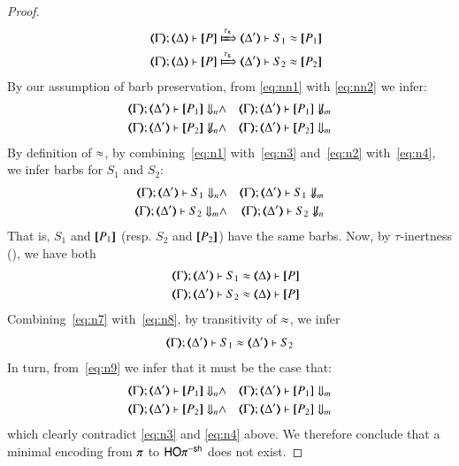 \documentclass[preprint,11pt]{elsarticle}
\begin{document}
{{\begin{proof}
\begin{eqnarray}
		& & \horel{\mapt{\Gamma}}{\mapt{\Delta}}{\map{P}}{\Hby{\stau}}{\mapt{\Delta'}}{S_1 \WB \map{P_1}} \label{eq:n1} \\
		& & \horel{\mapt{\Gamma}}{\mapt{\Delta}}{\map{P}}{\Hby{\stau}}{\mapt{\Delta'}}{S_2 \WB \map{P_2}} \label{eq:n2}
	\end{eqnarray}
	By our assumption of barb preservation, 
	from \eqref{eq:nn1} with \eqref{eq:nn2}
	we infer: 
	\begin{eqnarray}
		\mapt{\Gamma}; \mapt{\Delta'} \proves \map{P_1} \Barb{n} & \land & 
		\mapt{\Gamma}; \mapt{\Delta'} \proves \map{P_1} \nBarb{m} \label{eq:n3} \\
		\mapt{\Gamma}; \mapt{\Delta'} \proves \map{P_2} \nBarb{n}   & \land & 
		\mapt{\Gamma}; \mapt{\Delta'} \proves \map{P_2} \Barb{m} \label{eq:n4}
	\end{eqnarray}
	By definition of $\approx$, 
	by combining~\eqref{eq:n1} with~\eqref{eq:n3}
	and~\eqref{eq:n2} with~\eqref{eq:n4}, we infer barbs for $S_1$ and $S_2$:
	\begin{eqnarray}
		\mapt{\Gamma}; \mapt{\Delta'} \proves S_1 \Barb{n} & \land & 
		\mapt{\Gamma}; \mapt{\Delta'} \proves S_1 \nBarb{m} \label{eq:n5} \\
		\mapt{\Gamma}; \mapt{\Delta'} \proves S_2 \Barb{m} & \land & 
		\mapt{\Gamma}; \mapt{\Delta'} \proves S_2 \nBarb{n} \label{eq:n6}
	\end{eqnarray}
	That is, $S_1$ and $[\!\![P_1]\!\!]$ 
	(resp. $S_2$ and $[\!\![P_2]\!\!]$)
	have the same barbs.
	Now, by $\tau$-inertness (), we have both 
	\begin{eqnarray}
		& & \horel{\mapt{\Gamma}}{\mapt{\Delta'}}{S_1}{\WB}{\mapt{\Delta}}{\map{P}} \label{eq:n7} \\
		& & \horel{\mapt{\Gamma}}{\mapt{\Delta'}}{S_2}{\WB}{\mapt{\Delta}}{\map{P}} \label{eq:n8}
	\end{eqnarray}
	Combining~\eqref{eq:n7} with~\eqref{eq:n8}, by transitivity of $\approx$,
	we infer
	\begin{equation}
		\horel{\mapt{\Gamma}}{\mapt{\Delta'}}{S_1}{\WB}{\mapt{\Delta'}}{S_2} \label{eq:n9}
	\end{equation}
	In turn, from~\eqref{eq:n9}
	we infer that 
	it must be the case that:
	\begin{eqnarray*}
		\mapt{\Gamma}; \mapt{\Delta'} \proves \map{P_1} \Barb{n} & \land & 
		\mapt{\Gamma}; \mapt{\Delta'} \proves \map{P_1} \Barb{m} \label{eq:n10} \\
		\mapt{\Gamma}; \mapt{\Delta'} \proves \map{P_2} \Barb{n}  & \land & 
		 \mapt{\Gamma}; \mapt{\Delta'} \proves \map{P_2} \Barb{m} \label{eq:n11}
	\end{eqnarray*}
	which clearly contradict \eqref{eq:n3} and \eqref{eq:n4} above. 
	We therefore conclude that a minimal encoding from $\pi$ to $\mathsf{HO}\pi^{\mathsf{-sh}}$ does not exist.
\end{proof}

}}
\end{document}
